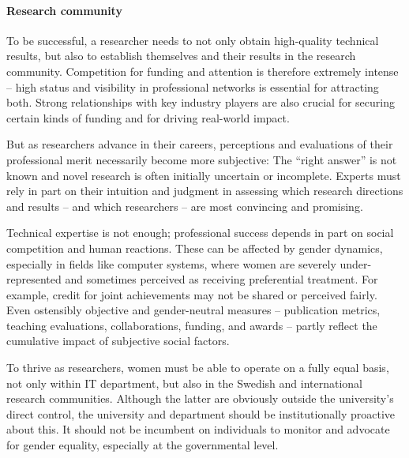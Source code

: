 \documentclass[a4paper,10pt,twocolumn]{article}
\begin{document}
\paragraph{Research community}
To be successful, a researcher needs to not only obtain high-quality
technical results, but also to establish themselves and their results
in the research community.  Competition for funding and attention is
therefore extremely intense -- high status and visibility in
professional networks is essential for attracting both.  Strong
relationships with key industry players are also crucial for securing
certain kinds of funding and for driving real-world impact.


But as researchers advance in their careers, perceptions and
evaluations of their professional merit necessarily become more
subjective: The ``right answer'' is not known and novel research is
often initially uncertain or incomplete.  Experts must rely in part on
their intuition and judgment in assessing which research directions
and results -- and which researchers -- are most convincing and
promising.


Technical expertise is not enough; professional success depends in
part on social competition and human reactions.  These can be affected
by gender dynamics, especially in fields like computer systems, where
women are severely under-represented and sometimes perceived as
receiving preferential treatment.  For example, credit for joint
achievements may not be shared or perceived fairly.  Even ostensibly
objective and gender-neutral measures -- publication metrics, teaching
evaluations, collaborations, funding, and awards -- partly reflect the
cumulative impact of subjective social factors.

To thrive as researchers, women must be able to operate on a fully
equal basis, not only within IT department, but also in the Swedish
and international research communities.  Although the latter are
obviously outside the university's direct control, the university and
department should be institutionally proactive about this.  It should
not be incumbent on individuals to monitor and advocate for gender
equality, especially at the governmental level.
\end{document}
